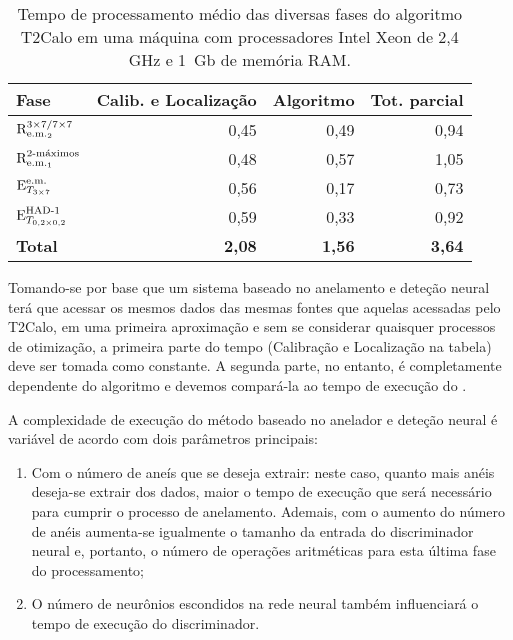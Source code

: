\begin{table}
\caption{Tempo de processamento médio das diversas fases do algoritmo T2Calo
em uma máquina com processadores Intel Xeon de 2,4 GHz e 1~Gb de memória RAM.}
\label{tab:t2calo-performance}
\begin{center}
\begin{tabular}{|l|r|r|r|} \hline
\textbf{Fase} & \textbf{Calib. e Localização} & 
\textbf{Algoritmo} & \textbf{Tot. parcial}\\ \hline
$\rcore$ & 0,45 & 0,49 & 0,94 \\ 
$\eratio$ & 0,48 & 0,57 & 1,05 \\ 
$\etem$ & 0,56 & 0,17 & 0,73 \\ 
$\ethad$ & 0,59 & 0,33 & 0,92 \\ \hline
\textbf{Total} & \textbf{2,08} & \textbf{1,56} & \textbf{3,64} \\ \hline
\end{tabular}
\end{center}
\end{table}

Tomando-se por base que um sistema baseado no anelamento e deteção neural terá
que acessar os mesmos dados das mesmas fontes que aquelas acessadas pelo
T2Calo, em uma primeira aproximação e sem se considerar quaisquer processos de
otimização, a primeira parte do tempo (Calibração e Localização na tabela)
deve ser tomada como constante. A segunda parte, no entanto, é completamente
dependente do algoritmo e devemos compará-la ao tempo de execução do
.

A complexidade de execução do método baseado no anelador e deteção neural é
variável de acordo com dois parâmetros principais:

\begin{enumerate}
\item Com o número de aneís que se deseja extrair: neste caso, quanto mais
anéis deseja-se extrair dos dados, maior o tempo de execução que será
necessário para cumprir o processo de anelamento. Ademais, com o aumento do
número de anéis aumenta-se igualmente o tamanho da entrada do discriminador
neural e, portanto, o número de operações aritméticas para esta última fase do
processamento;
\item O número de neurônios escondidos na rede neural também influenciará o
tempo de execução do discriminador.
\end{enumerate}

